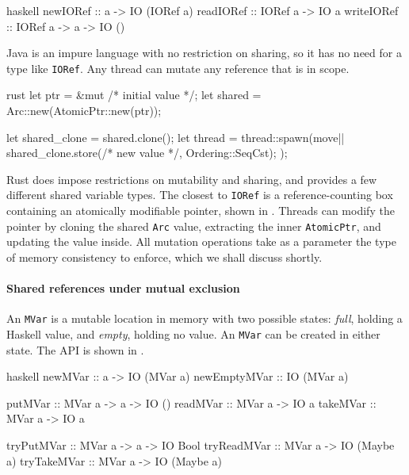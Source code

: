 \begin{listing}
\centering
\begin{cminted}{haskell}
newIORef   :: a -> IO (IORef a)
readIORef  :: IORef a -> IO a
writeIORef :: IORef a -> a -> IO ()
\end{cminted}
\caption{Shared mutable references in Haskell.}\label{lst:smref_haskell}
\end{listing}

Java is an impure language with no restriction on sharing, so it has
no need for a type like \verb|IORef|.  Any thread can mutate any
reference that is in scope.

\begin{listing}
\centering
\begin{cminted}{rust}
let ptr = &mut /* initial value */;
let shared = Arc::new(AtomicPtr::new(ptr));

let shared_clone = shared.clone();
let thread = thread::spawn(move|| {
    shared_clone.store(/* new value */, Ordering::SeqCst);
});
\end{cminted}
\caption{Shared mutable references in Rust.}\label{lst:smref_rust}
\end{listing}

Rust does impose restrictions on mutability and sharing, and provides
a few different shared variable types.  The closest to \verb|IORef| is
a reference-counting box containing an atomically modifiable pointer,
shown in .  Threads can modify the pointer by
cloning the shared \verb|Arc| value, extracting the inner
\verb|AtomicPtr|, and updating the value inside.  All mutation
operations take as a parameter the type of memory consistency to
enforce, which we shall discuss shortly. \label{page:rust_mem}

\paragraph{Shared references under mutual exclusion}
An \verb|MVar| is a mutable location in memory with two possible
states: \emph{full}, holding a Haskell value, and \emph{empty},
holding no value.  An \verb|MVar| can be created in either state.  The
API is shown in .

\begin{listing}
\centering
\begin{cminted}{haskell}
newMVar      :: a -> IO (MVar a)
newEmptyMVar :: IO (MVar a)

putMVar      :: MVar a -> a -> IO ()
readMVar     :: MVar a -> IO a
takeMVar     :: MVar a -> IO a

tryPutMVar   :: MVar a -> a -> IO Bool
tryReadMVar  :: MVar a -> IO (Maybe a)
tryTakeMVar  :: MVar a -> IO (Maybe a)
\end{cminted}
\caption{Mutual exclusion in Haskell.}\label{lst:mute_haskell}
\end{listing}

